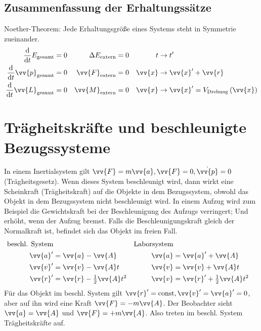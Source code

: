 \documentclass[a4paper,12pt]{article}
\begin{document}
\subsection{Zusammenfassung der Erhaltungssätze}
Noether-Theorem: Jede Erhaltungsgröße eines Systems steht in Symmetrie zueinander.
\begin{align*}
        \dfrac{\text{d}}{\text{d}t}E_{\text{gesamt}}&=0&\Delta E_{\text{extern}}&=0&t&\rightarrow t'\\
        \dfrac{\text{d}}{\text{d}t}\vv{p}_{\text{gesamt}}&=0&\vv{F}_{\text{extern}}&=0&\vv{x}&\rightarrow \vv{x}'+\vv{r}\\
        \dfrac{\text{d}}{\text{d}t}\vv{L}_{\text{gesamt}}&=0&\vv{M}_{\text{extern}}&=0&\vv{x}&\rightarrow \vv{x}'=V_{\text{Drehung}}\left(\vv{x}\right)
\end{align*}

\section{Trägheitskräfte und beschleunigte Bezugssysteme}
In einem Inertialsystem gilt $\vv{F}=m\vv{a},\vv{F}=0,\dot{\vv{p}}=0$ (Trägheitsgesetz). Wenn dieses System beschleunigt wird, dann wirkt eine Scheinkraft (Trägheitskraft) auf die Objekte in dem Bezugssystem, obwohl das Objekt in dem Bezugssystem nicht beschleunigt wird. In einem Aufzug wird zum Beispiel die Gewichtskraft bei der Beschleunigung des Aufzugs verringert; Und erhöht, wenn der Aufzug bremst. Falls die Beschleunigungskraft gleich der Normalkraft ist, befindet sich das Objekt im freien Fall.
\begin{align*}
        \text{beschl. System}&&\text{Laborsystem}\\
        \vv{a}'&=\vv{a}-\vv{A}&\vv{a}&=\vv{a}'+\vv{A}\\
        \vv{v}'&=\vv{v}-\vv{A}t&\vv{v}&=\vv{v}+\vv{A}t\\
        \vv{r}'&=\vv{r}-\tfrac{1}{2}\vv{A}t^2&\vv{v}&=\vv{r}'+\tfrac{1}{2}\vv{A}t^2
\end{align*}
Für das Objekt im beschl. System gilt $\vv{r}'=\text{const},\vv{v}'=\vv{a}'=0$, aber auf ihn wird eine Kraft $\vv{F}=-m\vv{A}$. Der Beobachter sieht $\vv{a}=\vv{A}$ und $\vv{F}=+m\vv{A}$. Also treten im beschl. System Trägheitskräfte auf.
\end{document}
